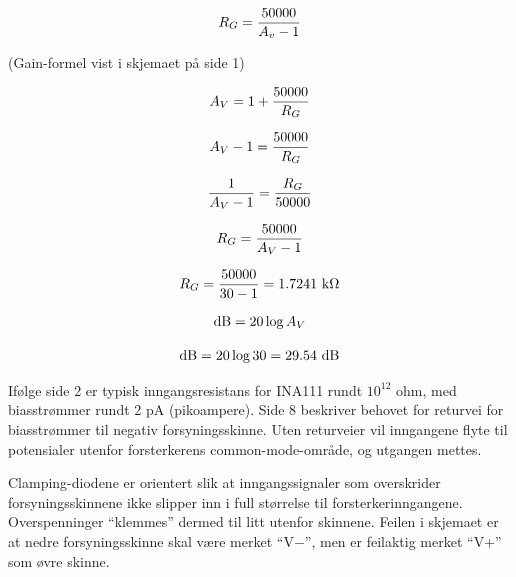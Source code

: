 \vskip 10pt

$$R_G = {50000 \over {A_v - 1}}$$







(Gain-formel vist i skjemaet på side 1)

$$A_V = 1 + {50000 \over R_G}$$

$$A_V - 1 = {50000 \over R_G}$$

$${1 \over A_V - 1} = {R_G \over 50000}$$

$$R_G = {50000 \over A_V - 1}$$

$$R_G = {50000 \over 30 - 1} = 1.7241 \hbox{ k}\Omega$$

\vskip 10pt

$$\hbox{dB} = 20 \log A_V$$

$$\hbox{dB} = 20 \log 30 = 29.54 \hbox{ dB}$$

Ifølge side 2 er typisk inngangsresistans for INA111 rundt $10^{12}$ ohm, med biasstrømmer rundt 2 pA (pikoampere). Side 8 beskriver behovet for returvei for biasstrømmer til negativ forsyningsskinne. Uten returveier vil inngangene flyte til potensialer utenfor forsterkerens common-mode-område, og utgangen mettes.

\vskip 10pt

Clamping-diodene er orientert slik at inngangssignaler som overskrider forsyningsskinnene ikke slipper inn i full størrelse til forsterkerinngangene. Overspenninger ``klemmes'' dermed til litt utenfor skinnene. Feilen i skjemaet er at nedre forsyningsskinne skal være merket ``V$-$'', men er feilaktig merket ``V+'' som øvre skinne.


